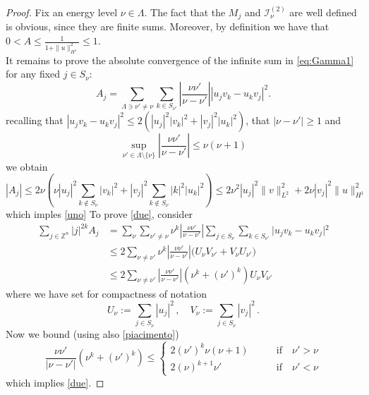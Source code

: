 \documentclass[reqno,11pt]{amsart}
\theoremstyle{plain}
\numberwithin{equation}{section}
\newcommand{\Z}{\mathbb{Z}}
\begin{document}
{	\begin{proof}
Fix an energy level $\nu \in \Lambda$. 
The fact that the $M_j$ and $\mathcal I_\nu^{(2)}$ are well defined is obvious, since they are finite sums.  Moreover, by definition we have that
$0<A\leq \frac{1}{1+\|u\|_{H^1}^2}\leq 1$.
\\
It remains to prove the absolute convergence of the infinite sum in \eqref{eq:Gamma1} for any fixed $j \in S_\nu$:
\begin{equation}\label{eq:Aj}
	A_j = \sum_{\Lambda\ni \nu'\ne \nu} \sum_{k \in S_{\nu'}} \left| \frac{\nu \nu' }{\nu - \nu'} \right| |u_j v_k - u_k v_j|^2.
\end{equation}
recalling that $ |u_j v_k - u_k v_j|^2 \leq 2\left( |u_j|^2 |v_k|^2 + |v_j|^2 |u_k|^2 \right) $, that $|\nu-\nu'|\geq 1$ and 
\begin{equation}\label{piacimento}
	\sup_{\nu' \in \Lambda \setminus \{\nu\}} \left| \frac{\nu \nu'}{\nu - \nu'} \right| \leq \nu(\nu+1)
\end{equation} we obtain 
\[
|A_j |\leq 2 \nu( \nu |u_j|^2   \sum_{k\notin S_\nu} |v_k|^2 +  |v_j|^2 \sum_{k\notin S_\nu}|k|^2 |u_k|^2) \leq 2 \nu^2 |u_j|^2  \|v\|_{L^2}^2 + 2\nu |v_j|^2 \|u\|_{H^1}^2
\]
which imples \eqref{uno}
To prove \eqref{due}, consider 
\[
\begin{aligned}
	\sum_{j\in \Z^n} |j|^{2 k} A_j &= \sum_{\nu} \sum_{\nu' \neq \nu} \nu^k \left\vert{} \frac{\nu \nu'}{\nu - \nu'} \right\vert{} \sum_{j \in S_\nu} \sum_{k \in S_{\nu'}} \vert{}u_j v_k - u_k v_j\vert{}^2 \\ &\leq  2 \sum_{\nu \neq \nu'} \nu^k \left\vert{} \frac{\nu \nu'}{\nu - \nu'} \right\vert{} \Big( U_\nu V_{\nu'} + V_\nu U_{\nu'} \Big)\\ & \leq 2\sum_{\nu \neq \nu'}  \left\vert{} \frac{\nu \nu'}{\nu - \nu'} \right\vert{}(\nu^k+(\nu')^k) U_\nu V_{\nu'} 
\end{aligned}
\]
where we have set for compactness of notation
\begin{equation}
	\label{blocchi}
	U_\nu:=\sum_{j\in S_\nu} |u_j|^2\,,\quad 	V_\nu:=\sum_{j\in S_\nu} |v_j|^2\,.
\end{equation}
Now we bound (using also \eqref{piacimento})
\begin{equation}\label{estimatetame}
	\frac{\nu \nu'}{|\nu - \nu'|} (\nu^k+(\nu')^k)  \leq	\begin{cases}
		2(\nu')^{k} \nu(\nu+1) \qquad &\mbox{if}\quad \nu'>\nu
		\\ 2(\nu)^{k+1} \nu' \qquad &\mbox{if}\quad \nu'<\nu
	\end{cases}
\end{equation}
which implies \eqref{due}.
\end{proof}

}
\end{document}
